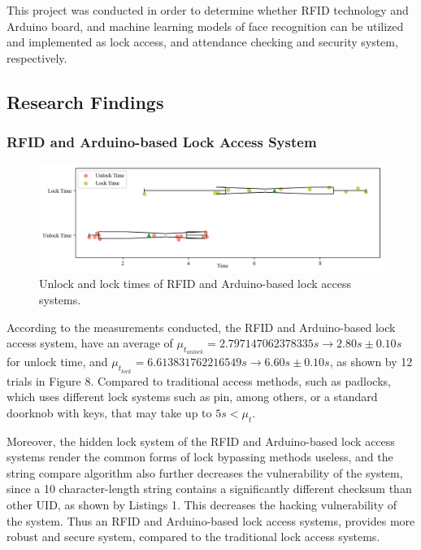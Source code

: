 \documentclass[12pt]{article}
\begin{document}
This project was conducted in order to determine whether RFID technology and Arduino board, and machine learning models of face recognition can be utilized and implemented as lock access, and attendance checking and security system, respectively.

\subsection*{Research Findings\centering}
\subsubsection*{RFID and Arduino-based Lock Access System}

\begin{figure}[h!]
	\centering
	\includegraphics[width=\textwidth]{fig_1da1.png}
	\caption{Unlock and lock times of RFID and Arduino-based lock access systems.}
\end{figure}

According to the measurements conducted, the RFID and Arduino-based lock access system, have an average of $\mu_{t_{unlock}} = 2.797147062378335s \longrightarrow 2.80s \pm 0.10s$ for unlock time, and $\mu_{t_{lock}} = 6.613831762216549s \longrightarrow 6.60s \pm 0.10s$, as shown by 12 trials in Figure 8. Compared to traditional access methods, such as padlocks, which uses different lock systems such as pin, among others, or a standard doorknob with keys, that may take up to $5s < \mu_{t}$.

Moreover, the hidden lock system of the RFID and Arduino-based lock access systems render the common forms of lock bypassing methods useless, and the string compare algorithm also further decreases the vulnerability of the system, since a 10 character-length string contains a significantly different checksum than other UID, as shown by Listings 1. This decreases the hacking vulnerability of the system. Thus an RFID and Arduino-based lock access systems, provides more robust and secure system, compared to the traditional lock access systems.
\end{document}
